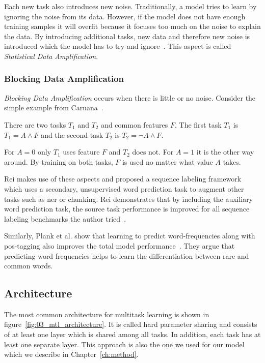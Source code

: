 Each new task also introduces new noise. Traditionally, a model tries to learn by ignoring the noise from its data. However, if the model does not have enough training samples it will overfit because it focuses too much on the noise to explain the data. By introducing additional tasks, new data and therefore new noise is introduced which the model has to try and ignore~\cite{Ruder2017}. This aspect is called \textit{Statistical Data Amplification}\cite{Caruana1995a}.

\subsubsection*{Blocking Data Amplification}

\textit{Blocking Data Amplification} occurs when there is little or no noise. Consider the simple example from Caruana~\cite{Caruana1995a}.

There are two tasks $T_1$ and $T_2$ and common features $F$. The first task $T_1$ is $T_1 = A \land F $ and the second task $T_2$ is $T_2 = \neg A \land F$. 

For $A=0$ only $T_1$ uses feature $F$ and $T_2$ does not. For $A=1$ it is the other way around. By training on both tasks, $F$ is used no matter what value $A$ takes. 
\medskip

Rei makes use of these aspects and proposed a sequence labeling framework which uses a secondary, unsupervised word prediction task to augment other tasks such as \gls{ner} or chunking. Rei demonstrates that by including the auxiliary word prediction task, the source task performance is improved for all sequence labeling benchmarks the author tried~\cite{Rei2017}.
\medskip

Similarly, Plank et al. show that learning to predict word-frequencies along with \gls{pos}-tagging also improves the total model performance~\cite{Plank}. They argue that predicting word frequencies helps to learn the differentiation between rare and common words.


\subsection{Architecture}
The most common architecture for multitask learning is shown in figure~\ref{fig:03_mtl_architecture}. It is called hard parameter sharing and consists of at least one layer which is shared among all tasks. In addition, each task has at least one separate layer. This approach is also the one we used for our model which we describe in Chapter~\ref{ch:method}. 

